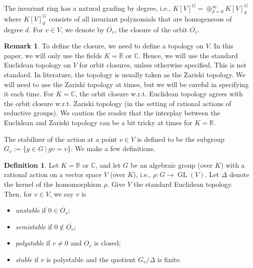 \documentclass[11pt]{amsart}
\theoremstyle{definition}
\newtheorem{definition}[theorem]{Definition}
\newtheorem{remark}[theorem]{Remark}
\newcommand{\R}{{\mathbb R}}
\newcommand{\C}{{\mathbb C}}
\newcommand{\GL}{\operatorname{GL}}
\begin{document}
The invariant ring has a natural grading by degree, i.e., $K[V]^G = \oplus_{d=0}^\infty K[V]^G_d$ where $K[V]^G_d$ consists of all invariant polynomials that are homogeneous of degree $d$. For $v \in V$, we denote by $\overline{O_v}$, the closure of the orbit $O_v$. 

\begin{remark} \label{topology}
To define the closure, we need to define a topology on $V$. In this paper, we will only use the fields $K = \R$ or $\C$. Hence, we will use the standard Euclidean topology on $V$ for orbit closures, unless otherwise specified. This is not standard. In literature, the topology is usually taken as the Zariski topology. We will need to use the Zariski topology at times, but we will be careful in specifying it each time. For $K = \C$, the orbit closure w.r.t. Euclidean topology agrees with the orbit closure w.r.t. Zariski topology (in the setting of rational actions of reductive groups). We caution the reader that the interplay between the Euclidean and Zariski topology can be a bit tricky at times for $K = \R$.
\end{remark}


The stabilizer of the action at a point $v \in V$ is defined to be the subgroup $G_v := \{g \in G \ |\ gv = v\}$. We make a few definitions.

\begin{definition}
Let $K = \R$ or $\C$, and let $G$ be an algebraic group (over $K$) with a rational action on a vector space $V$ (over $K$), i.e., $\rho: G \rightarrow \GL(V)$. Let $\Delta$ denote the kernel of the homomorphism $\rho$. Give $V$ the standard Euclidean topology. Then, for $v \in V$, we say $v$ is 
\begin{itemize}
\item {\em unstable} if $0 \in \overline{O_v}$;
\item  {\em semistable} if $0 \notin \overline{O_v}$;
\item  {\em polystable} if $v \neq 0$ and $O_v$ is closed;
\item  {\em stable} if $v$ is polystable and the quotient $G_v/\Delta$ is finite.
\end{itemize}
\end{definition}
\end{document}
